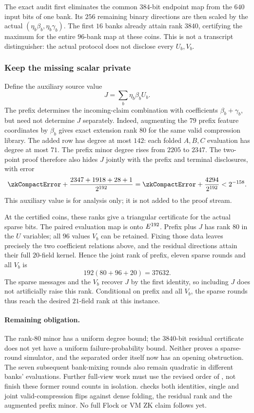 The exact audit first eliminates the common $384$-bit endpoint map from the $640$ input bits of one bank. Its $256$ remaining binary directions are then scaled by the actual $(\eta_b\beta_b,\eta_b\gamma_b)$. The first $16$ banks already attain rank $3840$, certifying the maximum for the entire $96$-bank map at these coins. This is not a transcript distinguisher: the actual protocol does not disclose every $U_b,V_b$.

\subsubsection{Keep the missing scalar private}

Define the auxiliary source value
\[
 J=\sum_b\eta_b\beta_b U_b.
\]
The prefix determines the incoming-claim combination with coefficients $\beta_b+\gamma_b$, but need not determine $J$ separately. Indeed, augmenting the $79$ prefix feature coordinates by $\beta_b$ gives exact extension rank $80$ for the same valid compression library. The added row has degree at most $142$: each folded $A,B,C$ evaluation has degree at most $71$. The prefix minor degree rises from $2205$ to $2347$. The two-point proof therefore also hides $J$ jointly with the prefix and terminal disclosures, with error
\[
 \zkCompactError+\frac{2347+1918+28+1}{2^{192}}
 =\zkCompactError+\frac{4294}{2^{192}}<2^{-158}.
\]
This auxiliary value is for analysis only; it is not added to the proof stream.

At the certified coins, these ranks give a triangular certificate for the actual sparse bits. The paired evaluation map is onto $E^{192}$. Prefix plus $J$ has rank $80$ in the $U$ variables; all $96$ values $V_b$ can be retained. Fixing those data leaves precisely the two coefficient relations above, and the residual directions attain their full $20$-field kernel. Hence the joint rank of prefix, eleven sparse rounds and all $V_b$ is
\[
 192(80+96+20)=37632.
\]
The sparse messages and the $V_b$ recover $J$ by the first identity, so including $J$ does not artificially raise this rank. Conditional on prefix and all $V_b$, the sparse rounds thus reach the desired $21$-field rank at this instance.

\paragraph{Remaining obligation.} The rank-$80$ minor has a uniform degree bound; the $3840$-bit residual certificate does not yet have a uniform failure-probability bound. Neither proves a sparse-round simulator, and the separated order itself now has an opening obstruction. The seven subsequent bank-mixing rounds also remain quadratic in different banks' evaluations. Further full-view work must use the revised order of , not finish these former round counts in isolation.  checks both identities, single and joint valid-compression flips against dense folding, the residual rank and the augmented prefix minor. No full Flock or VM ZK claim follows yet.
